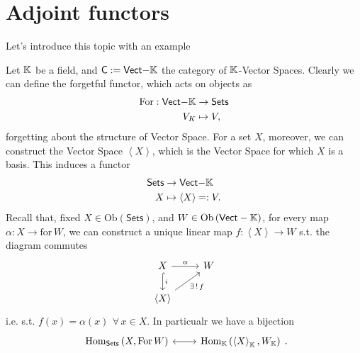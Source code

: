 \section{Adjoint functors}
Let's introduce this topic with an example
\begin{ex}
	Let $\mathbb{K}$ be a field, and $\mathsf{C} := \mathsf{Vect-}\mathbb{K}$ the category of $\mathbb{K}$-Vector Spaces.
	Clearly we can define the forgetful functor, which acts on objects as
	\begin{align}
		\mathrm{For}: \mathsf{Vect-}\mathbb{K} &\to \mathsf{Sets} \\
		V_K &\mapsto V
	,\end{align} 
	forgetting about the structure of Vector Space.
	For a set $X$, moreover, we can construct the Vector Space $\left\langle X \right\rangle$,
	which is the Vector Space  for which $X$ is a basis.
	This induces a functor
	\begin{align}
		 \mathsf{Sets} &\to \mathsf{Vect-}\mathbb{K} \\
		 X&\mapsto \left\langle X \right\rangle =: V
	.\end{align} 
	Recall that, fixed $X \in \mathrm{Ob} \left(\mathsf{Sets}\right)$, and $W \in \mathrm{Ob} \left(\mathsf{Vect}-\mathbb{K}\right)$,
	for every map $\alpha: X \to \mathrm{for}\, W$, we can construct a unique linear map
	$f: \left\langle X \right\rangle \to W$ s.t. the diagram commutes
	\begin{equation}
	\begin{tikzcd}
		X \arrow[r, "\alpha", rightarrow] \arrow[d, "i", hookrightarrow] &
		W\\
		\left\langle X \right\rangle \arrow[ru, "\exists\, !\, f"', rightarrow] &
	\end{tikzcd}
	\end{equation} 
	i.e. s.t. $f(x) = \alpha(x)\ \,\forall\, x \in X$.
	In particualr we have a bijection
	\begin{equation}
	\begin{tikzcd}
		\mathrm{Hom}_{\mathsf{Sets}} \left( X, \mathrm{For}\, W \right) \arrow[r, "", leftrightarrow] &
		\mathrm{Hom}_{\K} \left( \left\langle X \right\rangle_{\K}, W_{\K} \right)
	\end{tikzcd}
	.\end{equation} 
\end{ex} 

